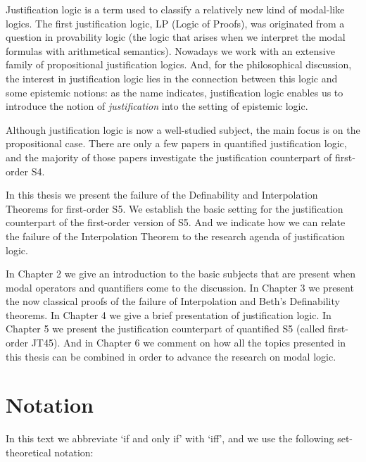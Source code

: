 \qquad Justification logic is a term used to classify a relatively new kind of modal-like logics. The first justification logic, LP (Logic of Proofs), was originated from a question in provability logic (the logic that arises when we interpret the modal formulas with arithmetical semantics). Nowadays we work with an extensive family of propositional justification logics. And, for the philosophical discussion, the interest in justification logic lies in the connection between this logic and some epistemic notions: as the name indicates, justification logic enables us to introduce the notion of \textit{justification} into the setting of epistemic logic. 

\qquad Although justification logic is now a well-studied subject, the main focus is on the propositional case. There are only a few papers in quantified justification logic, and the majority of those papers investigate the justification counterpart of first-order S4.


\qquad In this thesis we present the failure of the Definability and Interpolation Theorems for first-order S5. We establish the basic setting for the justification counterpart of the first-order version of S5. And we indicate how we can relate the failure of the Interpolation Theorem to the research agenda of justification logic.

\qquad In Chapter 2 we give an introduction to the basic subjects that are present when modal operators and quantifiers come to the discussion. In Chapter 3 we present the now classical proofs of the failure of Interpolation and Beth's Definability theorems.  In Chapter 4 we give a brief presentation of justification logic. In Chapter 5 we present the justification counterpart of quantified S5 (called first-order JT45). And in Chapter 6 we comment on how all the topics presented in this thesis can be combined in order to advance the research on modal logic. 



\section{Notation}

\qquad  In this text we abbreviate `if and only if' with `iff', and we use the following set-theoretical notation:

